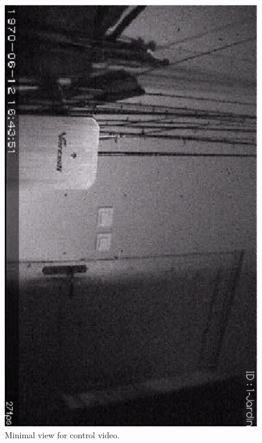 \begin{center}
\begin{figure}[H] 
  \label{videoView}
    \centering
   \includegraphics[angle=90,scale=0.3]{Images/videoView.eps}
  \caption{Minimal view for control video.}
\end{figure}
  

\end{center}
